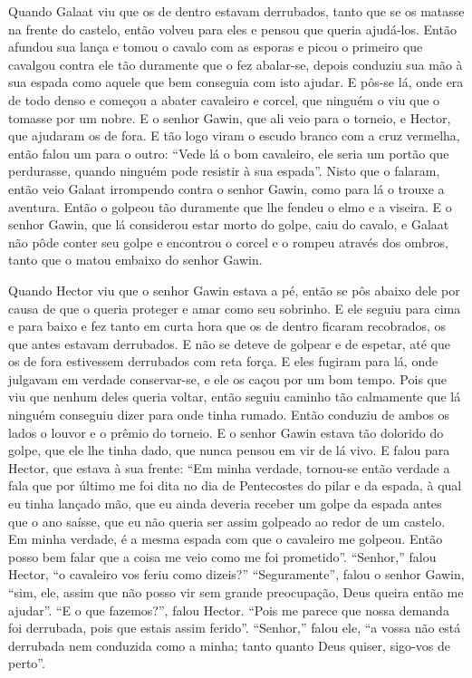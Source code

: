 Quando Galaat viu que os de dentro estavam derrubados, tanto que se os matasse
na frente do castelo, então volveu para eles e pensou que queria ajudá-los.
Então afundou sua lança e tomou o cavalo com as esporas e picou o primeiro que
cavalgou contra ele tão duramente que o fez abalar-se, depois conduziu sua mão
à sua espada como aquele que bem conseguia com isto ajudar. E pôs-se lá, onde
era de todo denso e começou a abater cavaleiro e corcel, que ninguém o viu que
o tomasse por um nobre. E o senhor Gawin, que ali veio para o torneio, e
Hector, que ajudaram os de fora. E tão logo viram o escudo branco com a cruz
vermelha, então falou um para o outro: “Vede lá o bom cavaleiro, ele seria um
portão que perdurasse, quando ninguém pode resistir à sua espada”. Nisto que o
falaram, então veio Galaat irrompendo contra o senhor Gawin, como para lá o
trouxe a aventura. Então o golpeou tão duramente que lhe fendeu o elmo e a
viseira. E o senhor Gawin, que lá considerou estar morto do golpe, caiu do
cavalo, e Galaat não pôde conter seu golpe e encontrou o corcel e o rompeu
através dos ombros, tanto que o matou embaixo do senhor Gawin.

Quando Hector viu que o senhor Gawin estava a pé, então se pôs abaixo dele por
causa de que o queria proteger e amar como seu sobrinho. E ele seguiu para cima
e para baixo e fez tanto em curta hora que os de dentro ficaram recobrados, os
que antes estavam derrubados. E não se deteve de golpear e de espetar, até que
os de fora estivessem derrubados com reta força. E eles fugiram para lá, onde
julgavam em verdade conservar-se, e ele os caçou por um bom tempo. Pois que viu
que nenhum deles queria voltar, então seguiu caminho tão calmamente que lá
ninguém conseguiu dizer para onde tinha rumado. Então conduziu de ambos os
lados o louvor e o prêmio do torneio. E o senhor Gawin estava tão dolorido do
golpe, que ele lhe tinha dado, que nunca pensou em vir de lá vivo. E falou para
Hector, que estava à sua frente: “Em minha verdade, tornou-se então verdade a
fala que por último me foi dita no dia de Pentecostes do pilar e da espada, à
qual eu tinha lançado mão, que eu ainda deveria receber um golpe da espada
antes que o ano saísse, que eu não queria ser assim golpeado ao redor de um
castelo. Em minha verdade, é a mesma espada com que o cavaleiro me golpeou.
Então posso bem falar que a coisa me veio como me foi prometido”. “Senhor,”
falou Hector, “o cavaleiro vos feriu como dizeis?” “Seguramente”, falou o
senhor Gawin, “sim, ele, assim que não posso vir sem grande preocupação, Deus
queira então me ajudar”. “E o que fazemos?”, falou Hector. “Pois me parece que
nossa demanda foi derrubada, pois que estais assim ferido”. “Senhor,” falou
ele, “a vossa não está derrubada nem conduzida como a minha; tanto quanto Deus
quiser, sigo-vos de perto”. 

